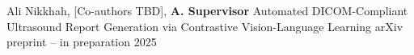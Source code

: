 %

\pubItem
  {Ali Nikkhah, [Co-authors TBD], \textbf{A. Supervisor}}
  {Automated DICOM-Compliant Ultrasound Report Generation via Contrastive Vision-Language Learning}
  {arXiv preprint -- in preparation}
  {2025}
